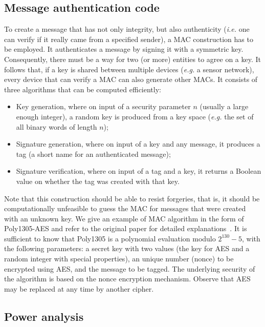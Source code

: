\documentclass{../sftex/sftex}
\begin{document}
\subsection{Message authentication code}

To create a message that has not only integrity, but also authenticity
(\emph{i.e.} one can verify if it really came from a specified sender), a MAC
construction has to be employed. It authenticates a message by signing it with
a symmetric key. Consequently, there must be a way for two (or more) entities
to agree on a key. It follows that, if a key is shared between multiple devices
(\emph{e.g.} a sensor network), every device that can verify a MAC can also
generate other MACs. It consists of three algorithms that can be computed
efficiently:

\begin{itemize}
  \item Key generation, where on input of a security parameter $n$ (usually a
      large enough integer), a random key is produced from a key space
        (\emph{e.g.} the set of all binary words of length $n$);
  \item Signature generation, where on input of a key and any message, it
      produces a tag (a short name for an authenticated message);
  \item Signature verification, where on input of a tag and a key, it returns a
      Boolean value on whether the tag was created with that key.
\end{itemize}

Note that this construction should be able to resist forgeries, that is, it
should be computationally unfeasible to guess the MAC for messages that were
created with an unknown key. We give an example of MAC algorithm in the form of
Poly1305-AES and refer to the original paper for detailed
explanations~\cite{Bernstein:inproc:2005:feb}. It is sufficient to know that
Poly1305 is a polynomial evaluation modulo $2^{130} - 5$, with the following
parameters: a secret key with two values (the key for AES and a random integer
with special properties), an unique number (nonce) to be encrypted using AES,
and the message to be tagged. The underlying security of the algorithm is based
on the nonce encryption mechanism. Observe that AES may be replaced at any time
by another cipher.

\subsection{Power analysis}
\end{document}
